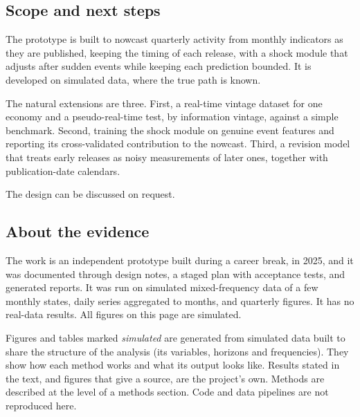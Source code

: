 \documentclass[
  british,
  a4paper,
]{article}
\begin{document}
\subsection{Scope and next steps}\label{scope-and-next-steps}

The prototype is built to nowcast quarterly activity from monthly
indicators as they are published, keeping the timing of each release,
with a shock module that adjusts after sudden events while keeping each
prediction bounded. It is developed on simulated data, where the true
path is known.

The natural extensions are three. First, a real-time vintage dataset for
one economy and a pseudo-real-time test, by information vintage, against
a simple benchmark. Second, training the shock module on genuine event
features and reporting its cross-validated contribution to the nowcast.
Third, a revision model that treats early releases as noisy measurements
of later ones, together with publication-date calendars.

The design can be discussed on request.

\subsection{About the evidence}\label{about-the-evidence}

The work is an independent prototype built during a career break, in
2025, and it was documented through design notes, a staged plan with
acceptance tests, and generated reports. It was run on simulated
mixed-frequency data of a few monthly states, daily series aggregated to
months, and quarterly figures. It has no real-data results. All figures
on this page are simulated.

Figures and tables marked \emph{simulated} are generated from simulated
data built to share the structure of the analysis (its variables,
horizons and frequencies). They show how each method works and what its
output looks like. Results stated in the text, and figures that give a
source, are the project's own. Methods are described at the level of a
methods section. Code and data pipelines are not reproduced here.
\end{document}
